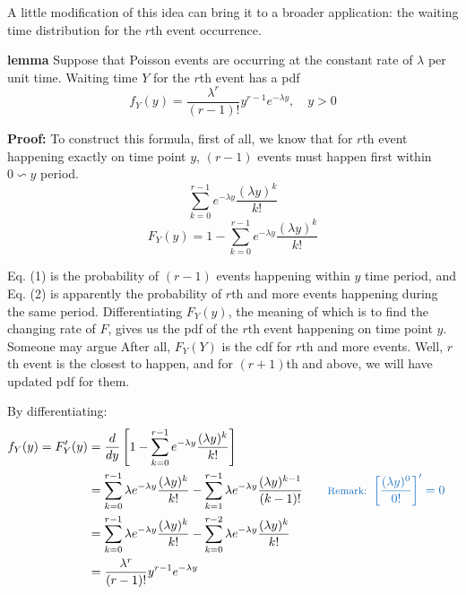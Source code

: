 \documentclass[11pt]{article}
\begin{document}
A little modification of this idea can bring it to a broader application: the waiting time distribution for the $r$th event occurrence.  

\begin{tcolorbox}[
	enhanced, 
	width=\textwidth, 
	fontupper=\normalsize,%
	drop fuzzy shadow southwest,
	boxrule=0.4pt,
	sharp corners,
	colframe=yellow!80!black,
	colback=yellow!10]
	
\textbf{\color{RoyalBlue} lemma} \quad Suppose that Poisson events are occurring at the constant rate of $\lambda$ per unit time.  Waiting time $Y$ for the $r$th event has a pdf
\[ 
f_Y(y) = \frac{\lambda ^r}{(r-1)!} y^{r-1} e^{-\lambda y}, \quad y>0
\]

\end{tcolorbox}


\textbf{Proof:} To construct this formula, first of all,  we know that for $r$th event happening exactly on time point $y$,  $(r-1)$ events must happen first within $0 \backsim y$ period.  
\begin{equation}
\sum _{k=0} ^{r-1} e^{-\lambda y} \frac{(\lambda y)^k}{k!}
\end{equation}
\begin{equation}
F_Y (y) = 1- \sum _{k=0} ^{r-1} e^{-\lambda y} \frac{(\lambda y)^k}{k!}
\end{equation}

Eq. (1) is the probability of $(r-1)$ events happening within $y$ time period,  and Eq.  (2) is apparently the probability of $r$th and more events happening during the same period.  Differentiating $F_Y(y)$,  the meaning of which is to find the changing rate of $F$,  gives us the pdf of the $r$th event happening on time point $y$.  Someone may argue  After all, $F_Y(Y)$ is the cdf for $r$th and more events.  Well, $r$th event is the closest to happen,  and for $(r+1)$th and above,  we will have updated pdf for them.     

By differentiating:
\[
\begin{aligned}
f_Y(y) = F' _Y (y) 
	&= \frac{d}{dy} \left[ 1- \sum _{k=0} ^{r-1} e^{-\lambda y} \frac{(\lambda y)^k}{k!} \right ] \\
	&= \sum _{k=0} ^{r-1} \lambda e^{-\lambda y} \frac{(\lambda y)^k}{k!} - \sum _{k=1} ^{r-1} \lambda e^{-\lambda y} \frac{(\lambda y)^{k-1} }{(k-1)!}  & \quad & \color{RoyalBlue}  \text{\footnotesize Remark: } \left[ \frac{(\lambda y)^0}{0!} \right]' = 0\\
	&= \sum _{k=0} ^{r-1} \lambda e^{-\lambda y} \frac{(\lambda y)^k}{k!}  - \sum _{k=0} ^{r-2} \lambda e^{-\lambda y} \frac{(\lambda y)^k}{k!} \\
	&= \frac{\lambda ^r}{(r-1)!} y^{r-1} e^{-\lambda y}
\end{aligned}
\]
\end{document}
